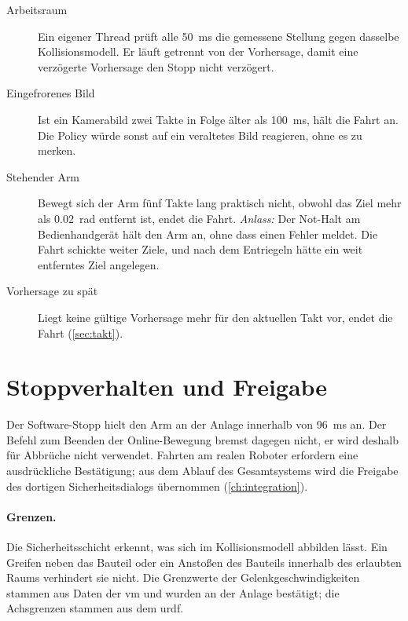 \begin{description}
  \item[Arbeitsraum] Ein eigener Thread prüft alle \SI{50}{\milli\second} die gemessene
    Stellung gegen dasselbe Kollisionsmodell. Er läuft getrennt von der Vorhersage, damit eine
    verzögerte Vorhersage den Stopp nicht verzögert.
  \item[Eingefrorenes Bild] Ist ein Kamerabild zwei Takte in Folge älter als
    \SI{100}{\milli\second}, hält die Fahrt an. Die Policy würde sonst auf ein veraltetes Bild
    reagieren, ohne es zu merken.
  \item[Stehender Arm] Bewegt sich der Arm fünf Takte lang praktisch nicht, obwohl das Ziel
    mehr als \SI{0.02}{rad} entfernt ist, endet die Fahrt. \emph{Anlass:} Der Not-Halt am
    Bedienhandgerät hält den Arm an, ohne dass  einen Fehler meldet. Die Fahrt
    schickte weiter Ziele, und nach dem Entriegeln hätte ein weit entferntes Ziel angelegen.
  \item[Vorhersage zu spät] Liegt keine gültige Vorhersage mehr für den aktuellen Takt vor,
    endet die Fahrt (\cref{sec:takt}).
\end{description}

\section{Stoppverhalten und Freigabe}
\label{sec:stopp}

Der Software-Stopp hielt den Arm an der Anlage innerhalb von \SI{96}{\milli\second} an. Der
Befehl zum Beenden der Online-Bewegung bremst dagegen nicht, er wird deshalb für Abbrüche
nicht verwendet. Fahrten am realen Roboter erfordern eine ausdrückliche Bestätigung; aus dem
Ablauf des Gesamtsystems wird die Freigabe des dortigen Sicherheitsdialogs übernommen
(\cref{ch:integration}).

\paragraph{Grenzen.} Die Sicherheitsschicht erkennt, was sich im Kollisionsmodell abbilden
lässt. Ein Greifen neben das Bauteil oder ein Anstoßen des Bauteils innerhalb des erlaubten
Raums verhindert sie nicht. Die Grenzwerte der Gelenkgeschwindigkeiten stammen aus Daten der
\ac{vm} und wurden an der Anlage bestätigt; die Achsgrenzen stammen aus dem \ac{urdf}.

